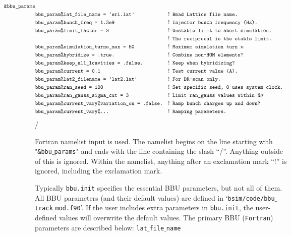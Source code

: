 \documentclass{article}
\begin{document}
\begin{align*}
\hspace*{-4cm}
\texttt{\&bbu$\_$params} \\
&\texttt{bbu$\_$param\%lat$\_$file$\_$name = `erl.lat'}  &!&\texttt{ Bmad Lattice file name.}\\
&\texttt{bbu$\_$param\%bunch$\_$freq = 1.3e9}  &!&\texttt{ Injector bunch frequency (Hz).} \\
&\texttt{bbu$\_$param\%limit$\_$factor = 3}  &!& \texttt{ Unstable limit to abort simulation.}\\
& &!&\texttt{ The reciprocal is the stable limit.}\\
&\texttt{bbu$\_$param\%simulation$\_$turns$\_$max = 50} &!& \texttt{ Maximum simulation turn $n$}\\
&\texttt{bbu$\_$param\%hybridize = .true.} &!&\texttt{ Combine non-HOM elements?}\\
&\texttt{bbu$\_$param\%keep$\_$all$\_$lcavities = .false.} &!&\texttt{ Keep when hybridizing?} \\
&\texttt{bbu$\_$param\%current = 0.1} &!&\texttt{ Test current value (A).} \\
&\texttt{bbu$\_$param\%lat2$\_$filename = `lat2.lat'} &!&\texttt{ For DR-scan only.} \\
&\texttt{bbu$\_$param\%ran$\_$seed = 100} &!&\texttt{ Set specific seed, 0 uses system clock.} \\
&\texttt{bbu$\_$param\%ran$\_$gauss$\_$sigma$\_$cut = 3} &!&\texttt{ Limit ran$\_$gauss values within N$\sigma$} \\
&\texttt{bbu$\_$param\%current$\_$vary\%variation$\_$on = .false.} &!& \texttt{ Ramp bunch charges up and down?}\\
&\texttt{bbu$\_$param\%current$\_$vary\%...} &!& \texttt{ Ramping parameters.} 
\end{align*}
\hspace*{-2cm}
/

Fortran namelist input is used. The namelist begins on the line starting with "\texttt{\&bbu$\_$params}"
and ends with the line containing the slash ``/''. Anything outside of this is ignored. Within the
namelist, anything after an exclamation mark ``!'' is ignored, including the exclamation mark.
 
Typically \texttt{bbu.init} specifies the essential BBU parameters, but not all of them. All BBU parameters (and their default values) are defined in `\texttt{bsim/code/bbu$\_$track$\_$mod.f90}'. If the user includes extra parameters in \texttt{bbu.init}, the user-defined values will overwrite the default values.
The primary BBU (\texttt{Fortran}) parameters are described below:
\bigbreak
\hspace*{-2cm}
\texttt{lat$\_$file$\_$name}
\end{document}
